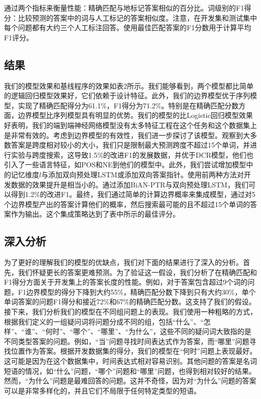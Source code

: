 \documentclass{article}
\begin{document}
\begin{CJK*}{UTF8}{gbsn}
    通过两个指标来衡量性能：精确匹配与地标记答案相似的百分比。词级别的F1得分：比较预测的答案中的词与人工标记的答案相似度。注意，在开发集和测试集中每个问题都有大约三个人工标注回答。使用最佳匹配答案的F1分数用于计算平均F1评分。

    \subsection{结果}
    我们的模型效果和基线程序的效果如表2所示。我们能够看到，两个模型都比简单的逻辑回归模型效果好，它们依赖于设计特征。此外，我们的边界模型优于序列模型，实现了精确匹配得分为61.1\%，F1得分为71.2\%。特别是在精确匹配分数方面，边界模型比序列模型具有明显的优势。我们的模型的比Logistic回归模型效果好表明，我们的端到端神经网络模型没有太多特征工程在这个任务和这个数据集上是非常有效的。考虑到边界模型的有效性，我们进一步探讨了该模型。观察到大多数答案是跨度相对较小的大小，我们只是限制最大预测跨度不超过15个单词，并进行实验与跨度搜索，这导致1.5\%的改进F1的发展数据，并优于DCR模型，他们也引入了一些语言特征，如POS和NE到他们的模型中。此外，我们尝试增加模型中的记忆维度$l$与添加双向预处理LSTM或添加双向答案指针。使用前两种方法对开发数据的效果提升是相当小的。通过添加BiAN-PTR与双向预处理LSTM，我们可以得到1.2\%的改进F1。最终，我们通过简单的计算边界概率来集成模型，通过对5个边界模型产出的答案计算他们的概率，然后搜索最可能的且不超过15个单词的答案作为输出。这个集成策略达到了表中所示的最佳评分。

    \subsection{深入分析}
    为了更好的理解我们的模型的优缺点，我们对下面的结果进行了深入的分析。首先，我们怀疑更长的答案更难预测。为了验证这一假设，我们分析了在精确匹配和F1得分方面关于开发集上的答案长度的性能。例如，对于答案包含超过9个词的问题，F1边界模型的得分下降到大约55\%，精确匹配分数下降到只有大约30\%，单个单词答案的问题F1得分和接近72\%和67\%的精确匹配分数。这支持了我们的假设。
    接下来，我们分析我们的模型在不同组问题上的表现。我们使用一种粗略的方式，根据我们定义的一组疑问词将问题分成不同的组，包括“什么”、“怎样”、“谁”、“何时”、“哪个”、“哪里”、“为什么”，这些不同的疑问词大致指的是不同类型答案的问题。例如，“当”问题寻找时间表达式作为答案，而“哪里”问题寻找位置作为答案。根据开发数据集的得分，我们的模型在“何时”问题上表现最好。这可能是因为在这个数据集中，时间表达式相对容易识别。其他问题的答案是名词短语的情况，如“什么”问题，“哪个”问题和“哪里”问题，也得到相对较好的结果。然而，“为什么”问题是最难回答的问题。这并不奇怪，因为对“为什么”问题的答案可以是非常多样化的，并且它们不局限于任何特定类型的短语。


\end{CJK*}
\end{document}
